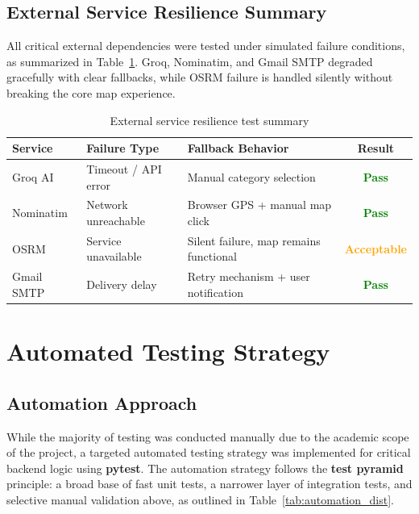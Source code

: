 \subsection{External Service Resilience Summary}
All critical external dependencies were tested under simulated failure conditions, as summarized in Table~\ref{tab:resilience_summary}. Groq, Nominatim, and Gmail SMTP degraded gracefully with clear fallbacks, while OSRM failure is handled silently without breaking the core map experience.


\begin{table}[H]
\caption{External service resilience test summary}
\centering
\renewcommand{\arraystretch}{1.3}
\begin{tabular}{|l|l|p{4cm}|c|}
\hline
\rowcolor{cyan!20}
\textbf{Service} & \textbf{Failure Type} & \textbf{Fallback Behavior} & \textbf{Result} \\
\hline
Groq AI & Timeout / API error & Manual category selection & \textcolor{green}{\textbf{Pass}} \\
\hline
Nominatim & Network unreachable & Browser GPS + manual map click & \textcolor{green}{\textbf{Pass}} \\
\hline
OSRM & Service unavailable & Silent failure, map remains functional & \textcolor{orange}{\textbf{Acceptable}} \\
\hline
Gmail SMTP & Delivery delay & Retry mechanism + user notification & \textcolor{green}{\textbf{Pass}} \\
\hline
\end{tabular}

\label{tab:resilience_summary}
\end{table}

\section{Automated Testing Strategy}

\subsection{Automation Approach}

While the majority of testing was conducted manually due to the academic scope of the project, a targeted automated testing strategy was implemented for critical backend logic using \textbf{pytest}. The automation strategy follows the \textbf{test pyramid} principle: a broad base of fast unit tests, a narrower layer of integration tests, and selective manual validation above, as outlined in Table~\ref{tab:automation_dist}.

